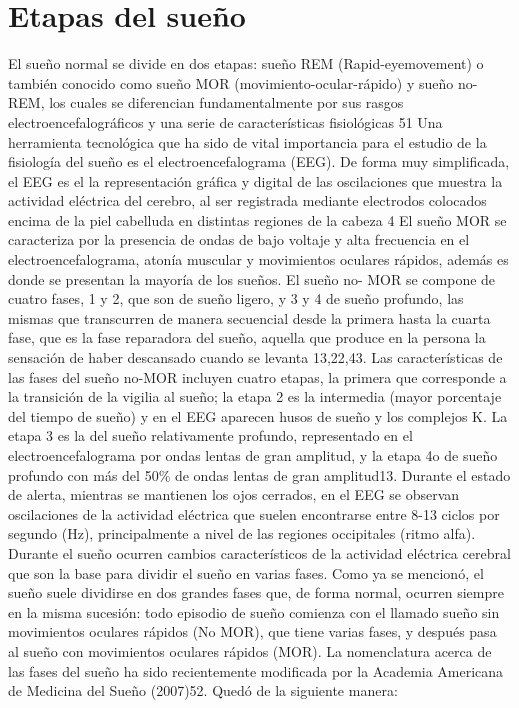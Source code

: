 \section{Etapas del sue\~no}

El sueño normal se divide en dos etapas: sueño REM (Rapid-eyemovement) o también conocido como sueño MOR (movimiento-ocular-rápido) y sueño no-REM, los cuales se diferencian fundamentalmente por sus rasgos electroencefalográficos y una serie de características fisiológicas 51
Una herramienta tecnológica que ha sido de vital importancia para el estudio de la fisiología del sueño es el electroencefalograma (EEG). De forma muy simplificada, el EEG es el la representación gráfica y digital de las oscilaciones que muestra la actividad eléctrica del cerebro, al ser registrada mediante electrodos colocados encima de la piel cabelluda en distintas regiones de la cabeza 4
El sueño MOR se caracteriza por la presencia de ondas de bajo voltaje y alta frecuencia en el electroencefalograma, atonía muscular y movimientos oculares rápidos, además es donde se presentan la mayoría de los sueños. El sueño no- MOR se compone de cuatro fases, 1 y 2, que son de sueño ligero, y 3 y 4 de sueño profundo, las mismas que transcurren de manera secuencial desde la primera hasta la cuarta fase, que es la fase reparadora del sueño, aquella que produce en la persona la sensación de haber descansado cuando se levanta 13,22,43.
Las características de las fases del sueño no-MOR incluyen cuatro etapas, la primera que corresponde a la transición de la vigilia al sueño; la etapa 2 es la intermedia (mayor porcentaje del tiempo de sueño) y en el EEG aparecen husos de sueño y los complejos K. La etapa 3 es la del sueño relativamente profundo, representado en el electroencefalograma por ondas lentas de gran amplitud, y la etapa 4o de sueño profundo con más del 50\% de ondas lentas de gran amplitud13.
	Durante el estado de alerta, mientras se mantienen los ojos cerrados, en el EEG se observan oscilaciones de la actividad eléctrica que suelen encontrarse entre 8-13 ciclos por segundo (Hz), principalmente a nivel de las regiones occipitales (ritmo alfa). Durante el sueño ocurren cambios característicos de la actividad eléctrica cerebral que son la base para dividir el sueño en varias fases. Como ya se mencionó, el sueño suele dividirse en dos grandes fases que, de forma normal, ocurren siempre en la misma sucesión: todo episodio de sueño comienza con el llamado sueño sin movimientos oculares rápidos (No MOR), que tiene varias fases, y después pasa al sueño con movimientos oculares rápidos (MOR). La nomenclatura acerca de las fases del sueño ha sido recientemente modificada por la Academia Americana de Medicina del Sueño (2007)52. Quedó de la siguiente manera:

